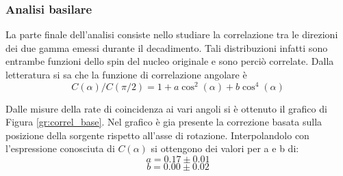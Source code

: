 \subsubsection{Analisi basilare}

La parte finale dell'analisi consiste nello studiare la correlazione tra le direzioni dei due gamma emessi durante il decadimento. Tali distribuzioni infatti sono entrambe funzioni dello spin del nucleo originale e sono perciò correlate. Dalla letteratura si sa che la funzione di correlazione angolare è 
\begin{equation}
	C(\alpha)/C(\pi/2) = 1+a\cos^2(\alpha)+b\cos^4(\alpha)
\end{equation}

Dalle misure della rate di coincidenza ai vari angoli si è ottenuto il grafico di Figura \ref{gr:correl_base}. Nel grafico è gia presente la correzione basata sulla posizione della sorgente rispetto all'asse di rotazione. Interpolandolo con l'espressione conosciuta di $C(\alpha)$ si ottengono dei valori per a e b di:
$$a=0.17\pm 0.01$$
$$b=0.00\pm 0.02$$


